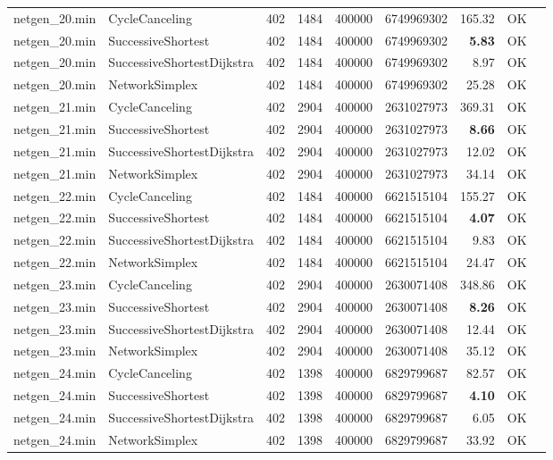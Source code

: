 \begin{longtable}{llrrrrrrl}
\midrule
netgen\_20.min & CycleCanceling & 402 & 1484 & 400000 & 6749969302 & 165.32 & OK \\
netgen\_20.min & SuccessiveShortest & 402 & 1484 & 400000 & 6749969302 & \textbf{5.83} & OK \\
netgen\_20.min & SuccessiveShortestDijkstra & 402 & 1484 & 400000 & 6749969302 & 8.97 & OK \\
netgen\_20.min & NetworkSimplex & 402 & 1484 & 400000 & 6749969302 & 25.28 & OK \\
\midrule
netgen\_21.min & CycleCanceling & 402 & 2904 & 400000 & 2631027973 & 369.31 & OK \\
netgen\_21.min & SuccessiveShortest & 402 & 2904 & 400000 & 2631027973 & \textbf{8.66} & OK \\
netgen\_21.min & SuccessiveShortestDijkstra & 402 & 2904 & 400000 & 2631027973 & 12.02 & OK \\
netgen\_21.min & NetworkSimplex & 402 & 2904 & 400000 & 2631027973 & 34.14 & OK \\
\midrule
netgen\_22.min & CycleCanceling & 402 & 1484 & 400000 & 6621515104 & 155.27 & OK \\
netgen\_22.min & SuccessiveShortest & 402 & 1484 & 400000 & 6621515104 & \textbf{4.07} & OK \\
netgen\_22.min & SuccessiveShortestDijkstra & 402 & 1484 & 400000 & 6621515104 & 9.83 & OK \\
netgen\_22.min & NetworkSimplex & 402 & 1484 & 400000 & 6621515104 & 24.47 & OK \\
\midrule
netgen\_23.min & CycleCanceling & 402 & 2904 & 400000 & 2630071408 & 348.86 & OK \\
netgen\_23.min & SuccessiveShortest & 402 & 2904 & 400000 & 2630071408 & \textbf{8.26} & OK \\
netgen\_23.min & SuccessiveShortestDijkstra & 402 & 2904 & 400000 & 2630071408 & 12.44 & OK \\
netgen\_23.min & NetworkSimplex & 402 & 2904 & 400000 & 2630071408 & 35.12 & OK \\
\midrule
netgen\_24.min & CycleCanceling & 402 & 1398 & 400000 & 6829799687 & 82.57 & OK \\
netgen\_24.min & SuccessiveShortest & 402 & 1398 & 400000 & 6829799687 & \textbf{4.10} & OK \\
netgen\_24.min & SuccessiveShortestDijkstra & 402 & 1398 & 400000 & 6829799687 & 6.05 & OK \\
netgen\_24.min & NetworkSimplex & 402 & 1398 & 400000 & 6829799687 & 33.92 & OK \\

\end{longtable}
